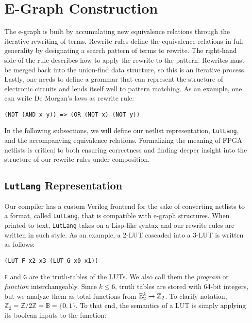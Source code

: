 \section{E-Graph Construction}\label{sec:rewrites}
The e-graph is built by accumulating new equivalence relations through the
iterative rewriting of terms. Rewrite rules define the equivalence relations in
full generality by designating a search pattern of terms to rewrite. The
right-hand side of the rule describes how to apply the rewrite to the pattern.
Rewrites must be merged back into the union-find data structure, so this is an
iterative process. Lastly, one needs to define a grammar that can represent the
structure of electronic circuits and lends itself well to pattern matching. As
an example, one can write De Morgan's laws as rewrite rule:

\begin{lstlisting}
(NOT (AND x y)) => (OR (NOT x) (NOT y))
\end{lstlisting}

In the following subsections, we will define our netlist representation,
\texttt{LutLang}, and the accompanying equivalence relations. Formalizing the
meaning of FPGA netlists is critical to both ensuring correctness and finding
deeper insight into the structure of our rewrite rules under composition.

\subsection{\texttt{LutLang} Representation}\label{sec:rewrites:lutlang}

Our compiler has a custom Verilog frontend for the sake of converting netlists
to a format, called \texttt{LutLang}, that is compatible with e-graph
structures. When printed to text, \texttt{LutLang} takes on a Lisp-like syntax
and our rewrite rules are written in such style. As an example, a 2-LUT
cascaded into a 3-LUT is written as follows:

\begin{lstlisting}
(LUT F x2 x3 (LUT G x0 x1))
\end{lstlisting}

\texttt{F} and \texttt{G} are the truth-tables of the LUTs.
We also call them the \textit{program} or \textit{function} interchangeably.
Since $k \leq 6$, truth tables are stored with 64-bit integers, but we analyze them as total functions from $\mathbb{Z}_{2}^{k} \rightarrow \mathbb{Z}_{2}$.
To clarify notation, $\mathbb{Z}_2 = \mathbb{Z}/2\mathbb{Z} = \mathbb{B} = \{0,1\}$.
To that end, the semantics of a LUT is simply applying its boolean inputs to the function:

